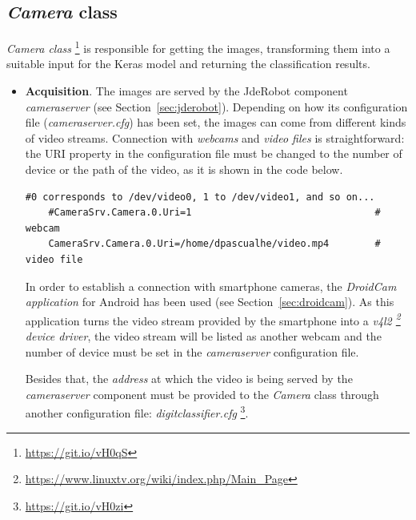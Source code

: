 \subsection{\textit{Camera} class}
\emph{\textit{Camera} class} \footnote{\url{https://git.io/vH0qS}} is responsible for getting the images, transforming them into a suitable input for the Keras model and returning the classification results.

\begin{itemize}
	\item \textbf{Acquisition}. The images are served by the JdeRobot component \emph{\textit{cameraserver}} (see Section~\ref{sec:jderobot}). Depending on how its configuration file (\textit{cameraserver.cfg}) has been set, the images can come from different kinds of video streams. Connection with \emph{webcams} and \emph{video files} is straightforward: the URI property in the configuration file must be changed to the number of device or the path of the video, as it is shown in the code below.
	\begin{lstlisting}[frame=single]
	#0 corresponds to /dev/video0, 1 to /dev/video1, and so on...
	#CameraSrv.Camera.0.Uri=1                                # webcam
	CameraSrv.Camera.0.Uri=/home/dpascualhe/video.mp4        # video file
	\end{lstlisting}
	
	In order to establish a connection with smartphone cameras, the \emph{DroidCam application} for Android has been used (see Section~\ref{sec:droidcam}). As this application turns the video stream provided by the smartphone into a \emph{v4l2 \footnote{\url{https://www.linuxtv.org/wiki/index.php/Main_Page}} device driver}, the video stream will be listed as another webcam and the number of device must be set in the \textit{cameraserver} configuration file.
	
	Besides that, the \emph{address} at which the video is being served by the \textit{cameraserver} component must be provided to the \textit{Camera} class through another configuration file: \emph{\textit{digitclassifier.cfg}} \footnote{\url{https://git.io/vH0zi}}.
	

\end{itemize}
